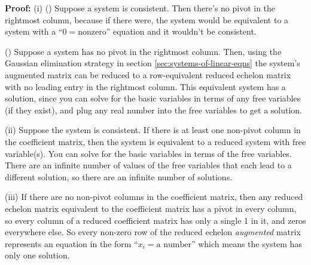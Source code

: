 \documentclass[11pt, letterpaper]{report}
\newenvironment{book}{}{}
\begin{document}
\begin{book}
\textbf{Proof:} (i) (\rightarrow) Suppose a system is consistent. Then there's no pivot in the rightmost column, because if there were, the system would be equivalent to a system with a ``$0 = \text{nonzero}$'' equation and it wouldn't be consistent.

(\leftarrow) Suppose a system has no pivot in the rightmost column. Then, using the Gaussian elimination strategy in section \ref{sec:systems-of-linear-eqns} the system's augmented matrix can be reduced to a row-equivalent reduced echelon matrix with no leading entry in the rightmost column. This equivalent system has a solution, since you can solve for the basic variables in terms of any free variables (if they exist), and plug any real number into the free variables to get a solution.

(ii) Suppose the system is consistent. If there is at least one non-pivot column in the coefficient matrix, then the system is equivalent to a reduced system with free variable(s). You can solve for the basic variables in terms of the free variables. There are an infinite number of values of the free variables that each lead to a different solution, so there are an infinite number of solutions.

(iii) If there are no non-pivot columns in the coefficient matrix, then any reduced echelon matrix equivalent to the coefficient matrix has a pivot in every column, so every column of a reduced coefficient matrix has only a single 1 in it, and zeros everywhere else. So every non-zero row of the reduced echelon \emph{augmented} matrix represents an equation in the form ``$x_i= \text{a number}$'' which means the system has only one solution.
\end{book}
\end{document}
